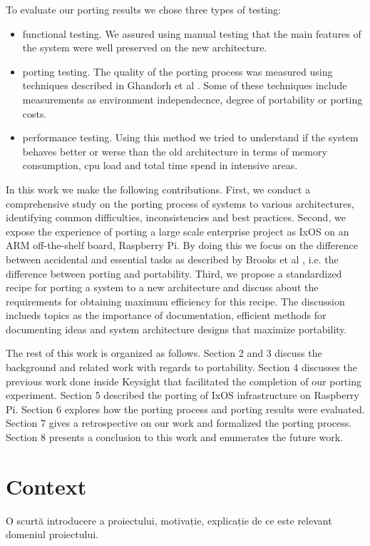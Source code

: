 \documentclass[12pt,a4paper]{report}
\begin{document}
To evaluate our porting results we chose three types of testing:
\begin{itemize}
	\item functional testing. We assured using manual testing that the main features of the
		system were well preserved on the new architecture.
	\item porting testing. The quality of the porting process was measured using techniques
		described in Ghandorh et al \cite{ghandorh2020systematic}. Some of these techniques
		include measurements as environment independecnce, degree of portability or porting
		costs.
	\item performance testing. Using this method we tried to understand if the system behaves
		better or werse than the old architecture in terms of memory consumption, cpu load
		and total time spend in intensive areas.
\end{itemize}

In this work we make the following contributions. First, we conduct a comprehensive study on the
porting process of systems to various architectures, identifying common difficulties,
inconsistencies and best practices. Second, we expose the experience of porting a large scale
enterprise project as IxOS on an ARM off-the-shelf board, Raspberry Pi. By doing this we focus on
the difference between accidental and essential tasks as described by Brooks et al
\cite{brooks1987no}, i.e. the difference between porting and portability. Third, we propose a
standardized recipe for porting a system to a new architecture and discuss about the requirements
for obtaining maximum efficiency for this recipe. The discussion inclueds topics as the
importance of documentation, efficient methods for documenting ideas and system architecture designs
that maximize portability.

The rest of this work is organized as follows. Section 2 and 3 discuss the background and related
work with regards to portability. Section 4 discusses the previous work done inside Keysight that
facilitated the completion of our porting experiment. Section 5 described the porting of IxOS
infrastructure on Raspberry Pi. Section 6 explores how the porting process and porting results were
evaluated. Section 7 gives a retrospective on our work and formalized the porting process. Section
8 presents a conclusion to this work and enumerates the future work.

\section{Context}
O scurtă introducere a proiectului, motivație, explicație de ce este relevant domeniul proiectului.
\end{document}
